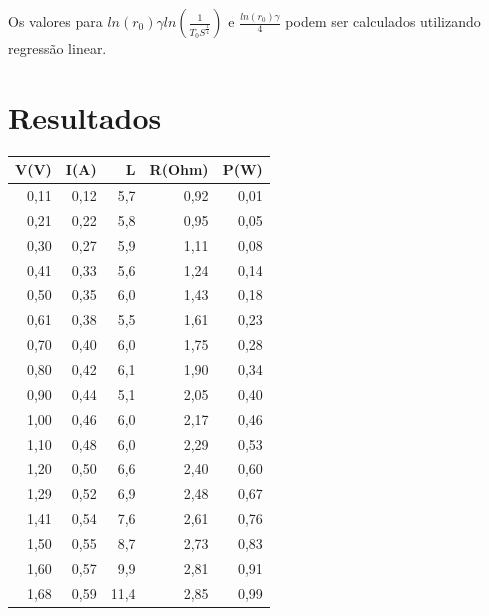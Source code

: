 \documentclass[brazilian,12pt,a4paper,twocolumn,final]{article}
\begin{document}
Os valores para $ln(r_0)\gamma ln(\frac{1}{T_0S^\frac{1}{4}})$
e $\frac{ln(r_0)\gamma}{4}$ podem ser calculados utilizando regressão linear. 

\section{Resultados}

\begin{table}[H]
\centering
\begin{tabular}{|r|r|r|r|r|} 
\hline
V(V)    &       I(A)    &       L       &       R(Ohm)  &       P(W)    \\
\hline
0,11    &       0,12    &       5,7     &       0,92    &       0,01    \\
0,21    &       0,22    &       5,8     &       0,95    &       0,05    \\
0,30    &       0,27    &       5,9     &       1,11    &       0,08    \\
0,41    &       0,33    &       5,6     &       1,24    &       0,14    \\
0,50    &       0,35    &       6,0     &       1,43    &       0,18    \\
0,61    &       0,38    &       5,5     &       1,61    &       0,23    \\
0,70    &       0,40    &       6,0     &       1,75    &       0,28    \\
0,80    &       0,42    &       6,1     &       1,90    &       0,34    \\
0,90    &       0,44    &       5,1     &       2,05    &       0,40    \\
1,00    &       0,46    &       6,0     &       2,17    &       0,46    \\
1,10    &       0,48    &       6,0     &       2,29    &       0,53    \\
1,20    &       0,50    &       6,6     &       2,40    &       0,60    \\
1,29    &       0,52    &       6,9     &       2,48    &       0,67    \\
1,41    &       0,54    &       7,6     &       2,61    &       0,76    \\
1,50    &       0,55    &       8,7     &       2,73    &       0,83    \\
1,60    &       0,57    &       9,9     &       2,81    &       0,91    \\
1,68    &       0,59    &       11,4    &       2,85    &       0,99    \\

\end{tabular}
\end{table}
\end{document}
